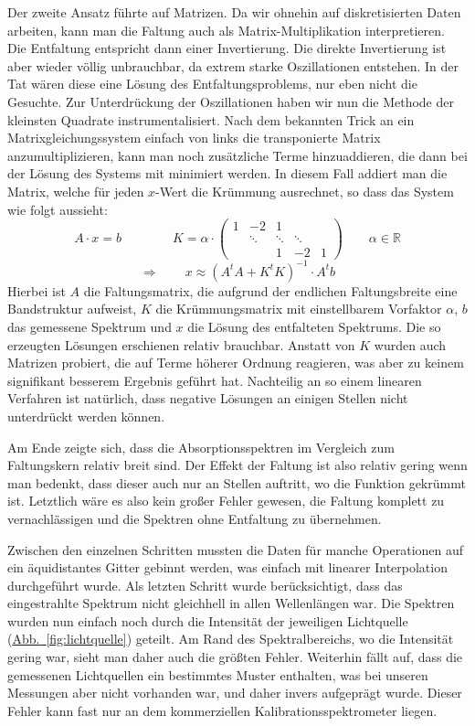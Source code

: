 \documentclass[11pt]{scrartcl}
\newcommand{\hypref}[2]{\hyperref[#2]{{#1}~\ref{#2}}}
\begin{document}
Der zweite Ansatz führte auf Matrizen.
Da wir ohnehin auf diskretisierten Daten arbeiten, kann man die Faltung auch als Matrix-Multiplikation interpretieren.
Die Entfaltung entspricht dann einer Invertierung.
Die direkte Invertierung ist aber wieder völlig unbrauchbar, da extrem starke Oszillationen entstehen.
In der Tat wären diese eine Lösung des Entfaltungsproblems, nur eben nicht die Gesuchte.
Zur Unterdrückung der Oszillationen haben wir nun die Methode der kleinsten Quadrate instrumentalisiert.
Nach dem bekannten Trick an ein Matrixgleichungssystem einfach von links die transponierte Matrix anzumultiplizieren, kann man noch zusätzliche Terme hinzuaddieren, die dann bei der Lösung des Systems mit minimiert werden.
In diesem Fall addiert man die Matrix, welche für jeden $x$-Wert die Krümmung ausrechnet, so dass das System wie folgt aussieht:
\begin{equation}
A\cdot x = b
\qquad\qquad
K = \alpha\cdot
\begin{pmatrix} 
  1 &	-2 &	1 &	&	\\
  &	\ddots&	\ddots&	\ddots&	\\
  &	&	1 &	-2 &	1
\end{pmatrix} 
\qquad
\alpha\in\mathbb{R}
\end{equation}
\begin{equation}
\Rightarrow\qquad
x \approx (A^t A + K^t K)^{-1}\cdot  A^t b
\end{equation}
Hierbei ist $A$ die Faltungsmatrix, die aufgrund der endlichen Faltungsbreite eine Bandstruktur aufweist, $K$ die Krümmungsmatrix mit einstellbarem Vorfaktor $\alpha$, $b$ das gemessene Spektrum und $x$ die Lösung des entfalteten Spektrums.
Die so erzeugten Lösungen erschienen relativ brauchbar.
Anstatt von $K$ wurden auch Matrizen probiert, die auf Terme höherer Ordnung reagieren, was aber zu keinem signifikant besserem Ergebnis geführt hat.
Nachteilig an so einem linearen Verfahren ist natürlich, dass negative Lösungen an einigen Stellen nicht unterdrückt werden können.

Am Ende zeigte sich, dass die Absorptionsspektren im Vergleich zum Faltungskern relativ breit sind.
Der Effekt der Faltung ist also relativ gering wenn man bedenkt, dass dieser auch nur an Stellen auftritt, wo die Funktion gekrümmt ist.
Letztlich wäre es also kein großer Fehler gewesen, die Faltung komplett zu vernachlässigen und die Spektren ohne Entfaltung zu übernehmen.

Zwischen den einzelnen Schritten mussten die Daten für manche Operationen auf ein äquidistantes Gitter gebinnt werden, was einfach mit linearer Interpolation durchgeführt wurde.
Als letzten Schritt wurde berücksichtigt, dass das eingestrahlte Spektrum nicht gleichhell in allen Wellenlängen war.
Die Spektren wurden nun einfach noch durch die Intensität der jeweiligen Lichtquelle (\hypref{Abb.}{fig:lichtquelle}) geteilt.
Am Rand des Spektralbereichs, wo die Intensität gering war, sieht man daher auch die größten Fehler.
Weiterhin fällt auf, dass die gemessenen Lichtquellen ein bestimmtes Muster enthalten, was bei unseren Messungen aber nicht vorhanden war, und daher invers aufgeprägt wurde.
Dieser Fehler kann fast nur an dem kommerziellen Kalibrations\-spektrometer liegen.
\end{document}
